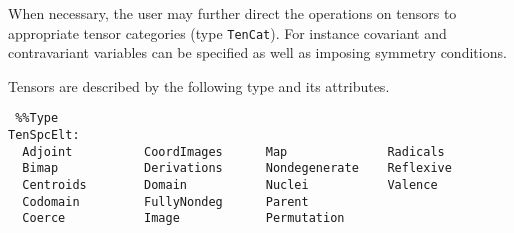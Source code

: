 \documentclass{amsart}
\begin{document}
When necessary, the user may further direct the operations on tensors to appropriate tensor categories 
(type {\tt TenCat}).  For instance covariant and contravariant variables can be specified
as well as imposing symmetry conditions.


Tensors are described by the following type and its attributes.

\color{blue}
{\small \begin{verbatim} %%Type
TenSpcElt:
  Adjoint          CoordImages      Map              Radicals
  Bimap            Derivations      Nondegenerate    Reflexive
  Centroids        Domain           Nuclei           Valence
  Codomain         FullyNondeg      Parent
  Coerce           Image            Permutation
\end{verbatim} }
\color{black}
\end{document}
